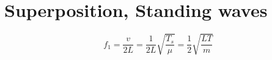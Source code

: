 \chapter{Superposition, Standing waves}

$$f_1 = \frac{v}{2L} = \frac{1}{2L}\sqrt{\frac{T_s}{\mu}} = \frac{1}{2} \sqrt{\frac{LT}{m}}$$